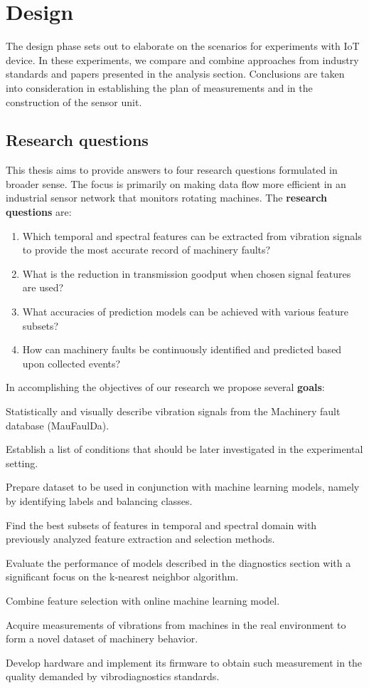 \chapter{Design} \label{chapter:design}
The design phase sets out to elaborate on the scenarios for experiments with IoT device. In these experiments, we compare and combine approaches from industry standards and papers presented in the analysis section. Conclusions are taken into consideration in establishing the plan of measurements and in the construction of the sensor unit.

\section{Research questions}
This thesis aims to provide answers to four research questions formulated in broader sense. The focus is primarily on making data flow more efficient in an industrial sensor network that monitors rotating machines. The \textbf{research questions} are:
\begin{enumerate}[label=RQ\arabic*., font=\bfseries]
    \itemsep0pt
	\item Which temporal and spectral features can be extracted from vibration signals to provide the most accurate record of machinery faults?
	\item What is the reduction in transmission goodput when chosen signal features are used?
	\item What accuracies of prediction models can be achieved with various feature subsets?
	\item How can machinery faults be continuously identified and predicted based upon collected events?
\end{enumerate}

\noindent In accomplishing the objectives of our research we propose several \textbf{goals}:
\begin{todolist}
    \itemsep0pt
	\item Statistically and visually describe vibration signals from the Machinery fault database (MauFaulDa).
	\item Establish a list of conditions that should be later investigated in the experimental setting.
	\item Prepare dataset to be used in conjunction with machine learning models, namely by identifying labels and balancing classes.
	\item Find the best subsets of features in temporal and spectral domain with previously analyzed feature extraction and selection methods.
	\item Evaluate the performance of models described in the diagnostics section with a significant focus on the k-nearest neighbor algorithm.
	\item Combine feature selection with online machine learning model.
	\item Acquire measurements of vibrations from machines in the real environment to form a novel dataset of machinery behavior.
	\item Develop hardware and implement its firmware to obtain such measurement in the quality demanded by vibrodiagnostics standards.
\end{todolist}

